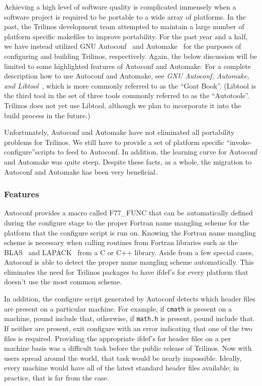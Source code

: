 \documentclass[12pt,relax]{article}
\newcommand{\InlineDirectory}[1]{
  {\hspace{0.01 in}} {\tt #1} {\hspace{0.01 in}}}
\begin{document}
Achieving a high level of software quality is complicated immensely when 
a software project is required to be portable to a wide array of platforms.
In the past, the Trilinos development team attempted to maintain a large 
number of platform specific makefiles to improve portability.  For the past 
year and a half, we have instead utilized GNU Autoconf~\cite{Autoconf} and 
Automake~\cite{Automake} for 
the purposes of configuring and building Trilinos, respectively.  Again, 
the below discussion will be limited to some highlighted features of Autoconf 
and Automake.  
For a complete description how to use Autoconf and Automake, see 
{\it GNU Autoconf, Automake, and Libtool}~\cite{GoatBook}, which is 
more commonly referred to as the ``Goat Book''.  (Libtool is the third tool 
in the set of three tools commonly referred to as the ``Autotools''.  Trilinos 
does not yet use Libtool, although we plan to incorporate it into the build 
process in the future.)

Unfortunately, Autoconf and Automake have not eliminated all portability 
problems for Trilinos.  We still have to provide a set of platform specific
``invoke-configure''scripts to feed to Autoconf.  In addition, the learning 
curve for Autoconf and Automake was quite steep.  Despite these facts, 
as a whole, the migration to Autoconf and Automake has been very 
beneficial.  

\subsubsection{Features}

Autoconf provides a macro called F77\_FUNC that can be 
automatically defined during the configure stage to the proper Fortran
name mangling scheme for the platform that the configure script is run on.  
Knowing the Fortran name mangling scheme is necessary when calling routines 
from Fortran libraries such as the BLAS~\cite{BLAS1,BLAS2,BLAS3} and 
LAPACK~\cite{lapack} from a C or C++ library.  Aside from a few special cases, 
Autoconf is able to detect the proper name mangling scheme automatically.  
This eliminates the need for Trilinos packages to have ifdef's for every 
platform that doesn't use the most common scheme.

In addition, the configure script generated by Autoconf detects which 
header files are present on a particular 
machine.  For example, if \InlineDirectory{cmath} is present on a machine, 
pound include that, otherwise, if \InlineDirectory{math.h} is present, pound 
include that.  If neither are present, exit configure with an error indicating 
that one of the two files is required.  Providing the appropriate ifdef's 
for header files on a per machine basis was a difficult task before the 
public release of Trilinos.  Now with users spread around the world, that 
task would be nearly impossible.  Ideally, every machine would 
have all of the latest standard header files available; in practice, that 
is far from the case.
\end{document}
